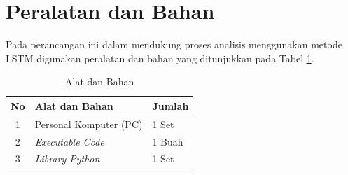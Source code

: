 %

\section{Peralatan dan Bahan}

Pada perancangan ini dalam mendukung proses analisis menggunakan metode LSTM digunakan peralatan dan bahan yang ditunjukkan pada Tabel \ref{tabel:alat dan bahan}. 
\begin{table}[h]
	\centering
	\caption{Alat dan Bahan}
	\begin{tabular}{|c|l|l|} 
		\hline
		\textbf{No} & \textbf{Alat dan Bahan}  & \textbf{Jumlah}  \\ 
		\hline
		1           & Personal Komputer (PC)   & 1 Set            \\ 
		\hline
		2           & \textit{Executable Code} & 1 Buah           \\ 
		\hline
		3           & \textit{Library Python}  & 1 Set            \\
		\hline
	\end{tabular}
%		
	\label{tabel:alat dan bahan}
\end{table}

